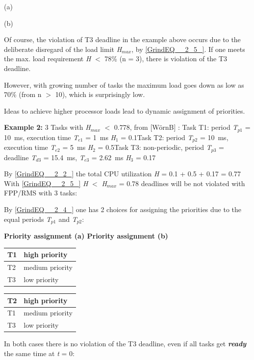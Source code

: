 (a)


(b)


Of course, the violation of T3 deadline in the example above occurs due to the deliberate disregard of the load limit \textit{H${}_{max}$}, by \eqref{GrindEQ__2_5_}. If one meets the max. load requirement \textit{H} $\mathrm{<}$ 78\% (n = 3), there is violation of the T3 deadline.

However, with growing number of tasks the maximum load goes down as low as 70\% (from n $\mathrm{>}$ 10), which is surprisingly low.

Ideas to achieve higher processor loads lead to dynamic assignment of priorities.

 \textbf{Example 2:} 3 Tasks with \textit{H}${}_{max}$ $\mathrm{<}$ 0.778, from [W\"{o}rnB] : Task T1: period \textit{T}${}_{p1}$ = 10~ms, execution time \textit{T}${}_{e1}$ = 1~ms  \textit{H}${}_{1}$ = 0.1Task T2: period \textit{T}${}_{p2}$ = 10~ms, execution time\textit{ T}${}_{e2}$ = 5~ms  \textit{H}${}_{2}$ = 0.5Task T3: non-periodic, period \textit{T}${}_{p3}$ = deadline \textit{T}${}_{d3}$ = 15.4~ms, \textit{T}${}_{e3}$ = 2.62~ms  \textit{H}${}_{3}$ = 0.17

By \eqref{GrindEQ__2_2_} the total CPU utilization \textit{H} = 0.1 + 0.5 + 0.17 = 0.77 With \eqref{GrindEQ__2_5_} \textit{H} $\mathrm{<}$ \textit{H}${}_{max}$ = 0.78 deadlines will be not violated with FPP/RMS with 3 tasks:

By \eqref{GrindEQ__2_4_} one has 2 choices for assigning the priorities due to the equal periods \textit{T}${}_{p1}$\textit{ }and \textit{T}${}_{p2}$:

\textbf{Priority assignment (a)   Priority assignment (b)}

\begin{tabular}{|p{0.5in}|p{0.9in}|} \hline 
T1 & high priority \\ \hline 
T2 & medium priority \\ \hline 
T3 & low priority \\ \hline 
\end{tabular}

\begin{tabular}{|p{0.2in}|p{0.9in}|} \hline 
T2 & high  priority \\ \hline 
T1 & medium priority \\ \hline 
T3 & low priority \\ \hline 
\end{tabular}

In both cases there is no violation of the T3 deadline, even if all tasks get \textbf{\textit{ready}} the same time at \textit{t} = 0: 

